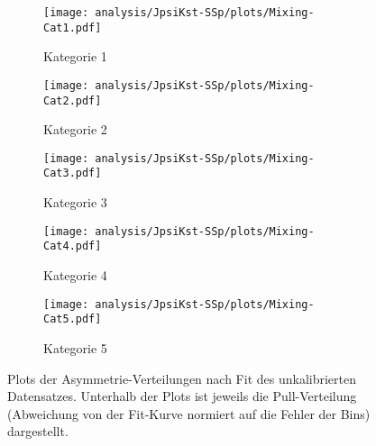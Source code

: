 \begin{figure}
        \centering
        \begin{subfigure}[b]{0.49\textwidth}
                \centering
                \texttt{[image: analysis/JpsiKst-SSp/plots/Mixing-Cat1.pdf]}
                \caption{Kategorie 1}
        \end{subfigure}
        \begin{subfigure}[b]{0.49\textwidth}
                \centering
                \texttt{[image: analysis/JpsiKst-SSp/plots/Mixing-Cat2.pdf]}
                \caption{Kategorie 2}
        \end{subfigure}

        \begin{subfigure}[b]{0.49\textwidth}
                \centering
                \texttt{[image: analysis/JpsiKst-SSp/plots/Mixing-Cat3.pdf]}
                \caption{Kategorie 3}
        \end{subfigure}
        \begin{subfigure}[b]{0.49\textwidth}
                \centering
                \texttt{[image: analysis/JpsiKst-SSp/plots/Mixing-Cat4.pdf]}
                \caption{Kategorie 4}
        \end{subfigure}

        \begin{subfigure}[b]{0.49\textwidth}
                \centering
                \texttt{[image: analysis/JpsiKst-SSp/plots/Mixing-Cat5.pdf]}
                \caption{Kategorie 5}
        \end{subfigure}
        \caption{Plots der Asymmetrie-Verteilungen nach Fit des unkalibrierten Datensatzes. Unterhalb der Plots ist jeweils die Pull-Verteilung (Abweichung von der Fit-Kurve normiert auf die Fehler der Bins) dargestellt.}
        \label{asymmetry-plots}
\end{figure}

